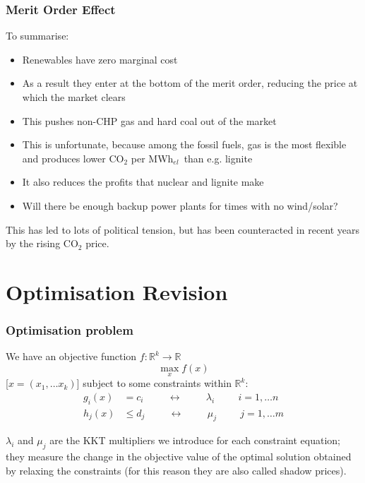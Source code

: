 \documentclass[10pt,aspectratio=169,dvipsnames]{beamer}
\newcommand{\R}{\mathbb{R}}
\def\l{\lambda}
\def\m{\mu}
\def\co2{CO${}_2$}
\def\el{${}_{el}$}
\let\olditem\item
\renewcommand{\item}{%
\olditem\vspace{5pt}}
\begin{document}
\begin{frame}
  \frametitle{Merit Order Effect}

  To summarise:
  \begin{itemize}
  \item Renewables have zero marginal cost
  \item As a result they enter at the bottom of the merit order, reducing the price at which the market clears
  \item This pushes non-CHP gas and hard coal out of the market
  \item This is unfortunate, because among the fossil fuels, gas is the most flexible and produces lower \co2
    per MWh\el~than e.g. lignite
  \item It also reduces the profits that nuclear and lignite make
  \item Will there be enough backup power plants for times with no wind/solar?
  \end{itemize}

  This has led to lots of political tension, but has been counteracted in recent years by the rising CO$_2$ price.

\end{frame}


\section{Optimisation Revision}

\begin{frame}
  \frametitle{Optimisation problem}


We have an \alert{objective function} $f: \R^k \to \R$
\begin{equation*}
  \max_{x} f(x)
\end{equation*}
[$x = (x_1, \dots x_k)$] subject to some \alert{constraints} within $\R^k$:
\begin{align*}
  g_i(x) & = c_i \hspace{1cm}\leftrightarrow\hspace{1cm} \l_i \hspace{1cm} i = 1,\dots n \\
  h_j(x) & \leq d_j \hspace{1cm}\leftrightarrow\hspace{1cm} \m_j \hspace{1cm} j = 1,\dots m
\end{align*}

$\l_i$ and $\m_j$ are the \alert{KKT multipliers} we introduce for
each constraint equation; they measure the change in the objective value of the optimal solution obtained by relaxing the constraints (for this reason they are also called \alert{shadow prices}).

\end{frame}
\end{document}
